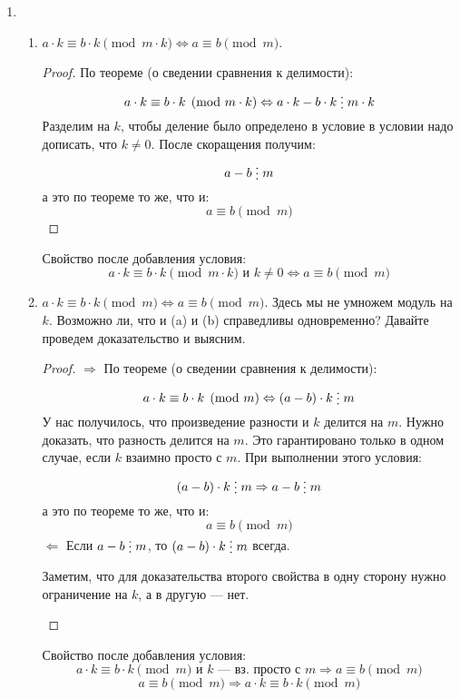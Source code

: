 \documentclass[russian]{lecture-notes}
\newcommand{\divs}{\mathrel{\raisebox{-2pt}{\vdots}}}
\begin{document}
\begin{enumerate}
\begin{proof}
	\end{proof}
	\item 	\begin{enumerate}
				\item $a \cdot k \equiv b \cdot k \pmod{m \cdot k} \Leftrightarrow a \equiv b \pmod m$.
				\label{sravn:2}
				\begin{proof}		
					По теореме (о сведении сравнения к делимости): 
					\[
						a \cdot k \equiv b \cdot k \pmod{m \cdot k} \Leftrightarrow a \cdot k - b \cdot k \divs m \cdot k
					\]
					Разделим на $k$, чтобы деление было определено в условие в условии надо дописать, что $k \ne 0$. После скоращения получим:
					\[
						a - b \divs m
					\]
					а это по теореме то же, что и:
					\[
						a \equiv b \pmod m
					\]
				\end{proof}
				Свойство после добавления условия: 
				\[
					a \cdot k \equiv b \cdot k \pmod{m \cdot k} \text{ и } k \ne 0 \Leftrightarrow a \equiv b \pmod m
				\]
				\item $a \cdot k \equiv b \cdot k \pmod m \Leftrightarrow a \equiv b \pmod m$. Здесь мы не умножем модуль на $k$. Возможно ли, что и (a) и (b) справедливы одновременно? Давайте проведем доказательство и выясним.
				\label{sravn:3}
				\begin{proof}
					$\Rightarrow$ По теореме (о сведении сравнения к делимости): 
					\[
						a \cdot k \equiv b \cdot k \pmod m \Leftrightarrow (a - b) \cdot k \divs m 
					\]
					У нас получилось, что произведение разности и $k$ делится на $m$. Нужно доказать, что разность делится на $m$. Это гарантировано только в одном случае, если $k$ взаимно просто с $m$. При выполнении этого условия:
					\[
						(a - b) \cdot k \divs m \Rightarrow a-b \divs m
					\]
					а это по теореме то же, что и:
					\[
						a \equiv b \pmod m
					\]
					$\Leftarrow$ Если $a-b \divs m$, то $(a - b) \cdot k \divs m$ всегда.
					\begin{remark}
						Заметим, что для доказательства второго свойства в одну сторону нужно ограничение на $k$, а в другую — нет.
					\end{remark}
				\end{proof}
				Свойство после добавления условия:
				\[
					a \cdot k \equiv b \cdot k \pmod m \text{ и } k \text{~--- вз. просто с } m \Rightarrow a \equiv b \pmod m
				\]
				\[
					a \equiv b \pmod m \Rightarrow a \cdot k \equiv b \cdot k \pmod m
				\]
			\end{enumerate}
\end{enumerate}
\end{document}

